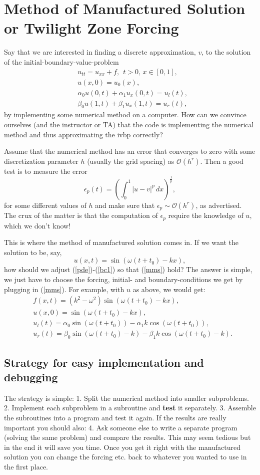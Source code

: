 \documentclass[11pt]{article}
\begin{document}
\section{Method of Manufactured Solution or Twilight Zone Forcing}
Say that we are interested in finding a discrete approximation, $v$, to the solution of the initial-boundary-value-problem 
\begin{align}
&u_{tt}=u_{xx}+f, \ \ t > 0,\, x\in[0,1], \label{pde}\\
& u(x,0) = u_0(x),\label{ic}\\
& \alpha_0 u(0,t) +\alpha_1 u_x(0,t) = u_l(t), \label{bc0}\\ 
& \beta_0 u(1,t) +\beta_1 u_x(1,t) = u_r(t), \label{bc1}
\end{align}
by implementing some numerical method on a computer. How can we convince ourselves (and the instructor or TA) that the code  is implementing the numerical method and thus approximating the ivbp correctly? 

Assume that the numerical method has an error that converges to zero with some discretization parameter $h$ (usually the grid spacing) as $\mathcal{O}(h^r)$. Then a good test is to measure the error 
\[
\epsilon_p(t)= \left( 
\int_0^1 |u-v|^p \,dx
\right)^{\frac{1}{p}},
\]
for some different values of $h$ and make sure that $\epsilon_p \sim \mathcal{O}(h^r)$, as advertised. The crux of the matter is that the computation of $\epsilon_p$ require the knowledge of $u$, which we don't know! 

This is where the method of manufactured solution comes in. If we want the solution to be, say,  
\begin{equation}\label{mms}
u(x,t) = \sin(\omega (t+t_0) -k x),
\end{equation}
how should we adjust (\ref{pde})-(\ref{bc1}) so that (\ref{mms}) hold? The answer is simple, we just have to choose the forcing, initial- and boundary-conditions we get by plugging in (\ref{mms}). For example, with $u$ as above, we would get:
\begin{align*}
& f(x,t)=(k^2-\omega^2) \sin(\omega (t+t_0) -k x),\\ 
& u(x,0) = \sin(\omega (t+t_0) -k x),\\
& u_l(t) =\alpha_0 \sin(\omega (t+t_0)) - \alpha_1 k \cos(\omega (t+t_0)),\\ 
& u_r(t) = \beta_0 \sin(\omega (t+t_0) -k) -\beta_1 k \cos(\omega (t+t_0)-k). 
\end{align*}
\subsection*{Strategy for easy implementation and debugging}
The strategy is simple: 1. Split the numerical method into smaller subproblems. 2. Implement each subproblem in a subroutine and {\bf test} it separately. 3. Assemble the subroutines into a program and test it again. If the results are really important you should also: 4. Ask someone else to write a separate program (solving the same problem) and compare the results. This may seem tedious but in the end it will save you time. Once you get it right with the manufactured solution you can change the forcing etc. back to whatever you wanted to use in the first place. 
\end{document}
